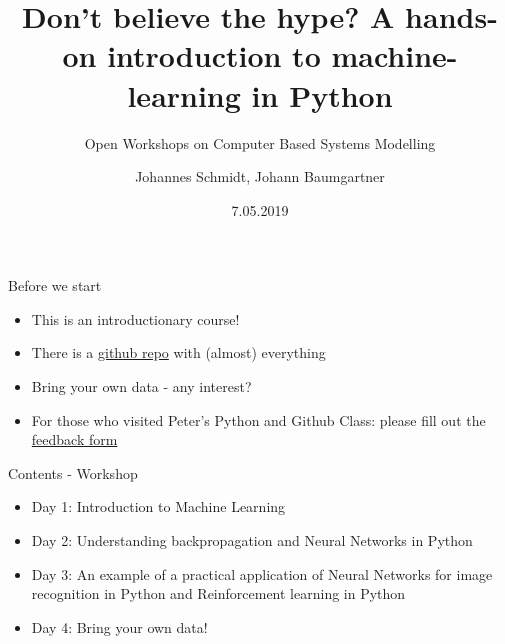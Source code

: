 \documentclass[color=usenames,dvipsnames]{beamer}
\title[Workshop - Machine Learning]{ Don't believe the hype? A hands-on introduction to machine-learning in Python}
\subtitle{Open Workshops on Computer Based Systems Modelling}
\author{Johannes Schmidt, Johann Baumgartner}
\institute{Institute for Sustainable Economic Development, BOKU, Vienna}
\date{7.05.2019}
\begin{document}
{


\begin{frame}

\maketitle



\end{frame}
}


\begin{frame}{Before we start}

\begin{itemize}
	\item This is an introductionary course!
	\item There is a \href{https://github.com/joph/Machine-Learning-Workshop}{github repo} with (almost) everything
	\item Bring your own data - any interest?
	\item For those who visited Peter's Python and Github Class: please fill out the \href{https://docs.google.com/forms/d/1jAt99D9SxDz3gBwxi_BlojSuq4-_fF8c1EXa63dkuiI}{feedback form}
\end{itemize}

\end{frame}


\begin{frame}{Contents - Workshop}

\begin{itemize}
\item Day 1: Introduction to Machine Learning
\item Day 2: Understanding backpropagation and Neural Networks in Python
\item Day 3: An example of a practical application of Neural Networks for image recognition in Python and Reinforcement learning in Python
\item Day 4: Bring your own data!
\end{itemize}

\end{frame}
\end{document}

